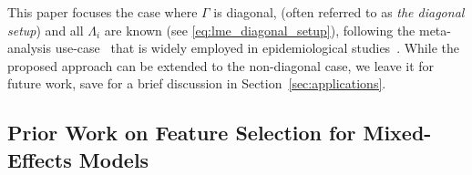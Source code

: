 %
%
%
%
% 
%


This paper focuses the case where $\Gamma$ is diagonal, 
  (often referred to as \textit{the diagonal setup}) 
 and all $\Lambda_i$ are known (see \eqref{eq:lme_diagonal_setup}), 
following the meta-analysis use-case~\citep{zheng2021trimmed} that is widely 
employed in epidemiological studies~\cite{murray2020global}. 
While the proposed approach can be extended to the non-diagonal case, we leave it for future work, save for a brief discussion in Section~\ref{sec:applications}.

\subsection{Prior Work on Feature Selection for Mixed-Effects Models}
\label{sec:prior_work}


